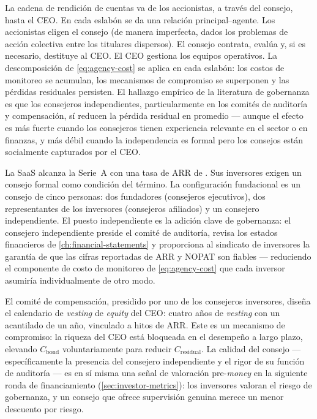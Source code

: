 La cadena de rendición de cuentas va de los accionistas, a través del consejo, hasta el CEO. En cada eslabón se da una relación principal--agente. Los accionistas eligen el consejo (de manera imperfecta, dados los problemas de acción colectiva entre los titulares dispersos). El consejo contrata, evalúa y, si es necesario, destituye al CEO. El CEO gestiona los equipos operativos. La descomposición de \cref{eq:agency-cost} se aplica en cada eslabón: los costos de monitoreo se acumulan, los mecanismos de compromiso se superponen y las pérdidas residuales persisten. El hallazgo empírico de la literatura de gobernanza es que los consejeros independientes, particularmente en los comités de auditoría y compensación, sí reducen la pérdida residual en promedio --- aunque el efecto es más fuerte cuando los consejeros tienen experiencia relevante en el sector o en finanzas, y más débil cuando la independencia es formal pero los consejos están socialmente capturados por el CEO.

\begin{example}
La SaaS alcanza la Serie~A con una tasa de ARR de . Sus inversores exigen un consejo formal como condición del término. La configuración fundacional es un consejo de cinco personas: dos fundadores (consejeros ejecutivos), dos representantes de los inversores (consejeros afiliados) y un consejero independiente. El puesto independiente es la adición clave de gobernanza: el consejero independiente preside el comité de auditoría, revisa los estados financieros de \cref{ch:financial-statements} y proporciona al sindicato de inversores la garantía de que las cifras reportadas de ARR y NOPAT son fiables --- reduciendo el componente de costo de monitoreo de \cref{eq:agency-cost} que cada inversor asumiría individualmente de otro modo.

El comité de compensación, presidido por uno de los consejeros inversores, diseña el calendario de \emph{vesting} de \emph{equity} del CEO: cuatro años de \emph{vesting} con un acantilado de un año, vinculado a hitos de ARR. Este es un mecanismo de compromiso: la riqueza del CEO está bloqueada en el desempeño a largo plazo, elevando \(C_{\text{bond}}\) voluntariamente para reducir \(C_{\text{residual}}\). La calidad del consejo --- específicamente la presencia del consejero independiente y el rigor de su función de auditoría --- es en sí misma una señal de valoración pre-\emph{money} en la siguiente ronda de financiamiento (\cref{sec:investor-metrics}): los inversores valoran el riesgo de gobernanza, y un consejo que ofrece supervisión genuina merece un menor descuento por riesgo.
\end{example}

